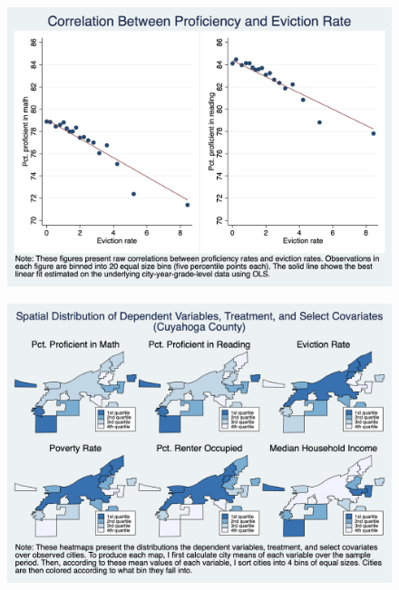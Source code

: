 \documentclass[12pt]{article}
\begin{document}
\begin{figure}[H]
    \centering
    \includegraphics[scale=0.4]{output/graphs/outcome_binscatter.png}
    \caption{}
    \label{fig:my_label}
\end{figure}

\begin{landscape}
\begin{figure}
    \centering
    \includegraphics[scale=0.5]{output/graphs/maps.png}
    \caption{}
    \label{fig:my_label}
\end{figure}
\end{landscape}
\end{document}
